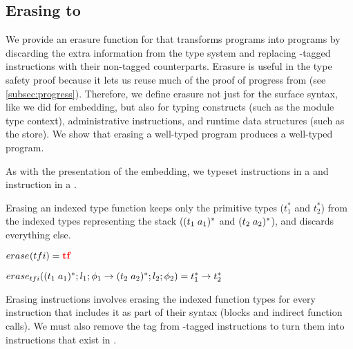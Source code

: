\subsection{Erasing \name to \wasm}
\label{subsec:erasure}
We provide an erasure function for \name that transforms \name programs into \wasm programs by discarding the extra information from the \name type system and replacing \prechk-tagged instructions with their non-tagged counterparts.
Erasure is useful in the type safety proof because it lets us reuse much of the proof of progress from \wasm (see \autoref{subsec:progress}).
Therefore, we define erasure not just for the surface syntax, like we did for embedding, but also for typing constructs (such as the module type context), administrative instructions, and runtime data structures (such as the store).
We show that erasing a well-typed \name program produces a well-typed \wasm program.

As with the presentation of the embedding, we typeset \name instructions in a  and \wasm instruction in a .

Erasing an indexed type function keeps only the primitive \wasm types ($t_1^{*}$ and $t_2^{*}$) from the indexed types representing the stack ($\ti{t_1}{a_1}^{*}$ and $\ti{t_2}{a_2}^{*}$), and discards everything else.

\begin{definition}{$\erase{tfi} = \mathredbold{tf}$}

    $\erase[tfi]{\ti{t_1}{a_1}^{*};l_1;\phi_1 \rightarrow \ti{t_2}{a_2}^{*};l_2;\phi_2} = t_1^{*} \rightarrow t_2^{*}$
\end{definition}

Erasing instructions involves erasing the indexed function types for every instruction that includes it as part of their syntax (blocks and indirect function calls).
We must also remove the \prechk tag from \prechk-tagged instructions to turn them into instructions that exist in \wasm.

